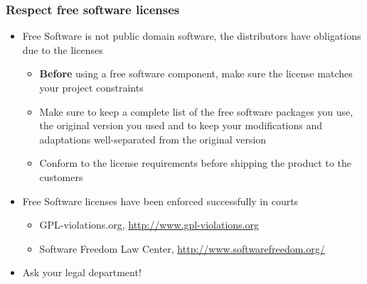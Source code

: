 \begin{frame}
  \frametitle{Respect free software licenses}
  \begin{itemize}
  \item Free Software is not public domain software, the distributors
    have obligations due to the licenses
    \begin{itemize}
    \item {\bf Before} using a free software component, make sure the
      license matches your project constraints
    \item Make sure to keep a complete list of the free software
      packages you use, the original version you used and to keep your
      modifications and adaptations well-separated from the original
      version
    \item Conform to the license requirements before shipping the
      product to the customers
    \end{itemize}
  \item Free Software licenses have been enforced successfully in
    courts
    \begin{itemize}
    \item GPL-violations.org, \url{http://www.gpl-violations.org}
    \item Software Freedom Law Center, \url{http://www.softwarefreedom.org/}
    \end{itemize}
  \item Ask your legal department!
  \end{itemize}
\end{frame}

